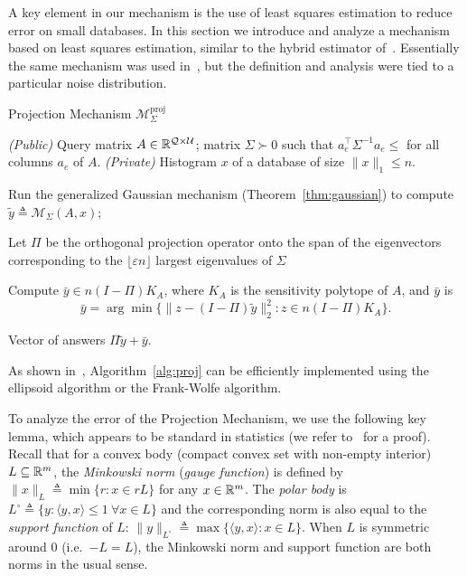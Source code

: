\documentclass{article}
\newcommand{\alg}{\mathcal{M}}
\newcommand{\mech}{\mathcal{M}}
\newcommand{\eps}{\varepsilon}
\newcommand{\univ}{U}
\newcommand{\tra}{\intercal}
\renewcommand{\univ}{\mathcal{U}}
\newcommand{\quer}{\mathcal{Q}}
\begin{document}
A key element in our mechanism is the use
of least squares estimation to reduce error on small databases. In this section we
introduce and analyze a mechanism based on least squares estimation,
similar to the hybrid estimator of~\cite{Zhang13-hybrid}. Essentially
the same mechanism was used in~\cite{NTZ}, but the definition and
analysis were tied to a particular noise distribution.

\begin{algorithm}
  \caption{Projection Mechanism    $\alg_{\Sigma}^{\text{proj}}$}\label{alg:proj}
  \begin{algorithmic}[1]
    \REQUIRE \emph{(Public)} Query matrix $A \in \R^{\quer \times
      \univ}$; matrix $\Sigma \succ 0$ such that $a_e^\tra \Sigma^{-1}
      a_e \leq$ for all columns $a_e$ of $A$.
    \REQUIRE \emph{(Private)} Histogram $x$ of a database of size
    $\|x\|_1 \leq n$.
    
    \STATE Run the generalized Gaussian mechanism
    (Theorem~\ref{thm:gaussian}) to compute $\tilde{y}
    \triangleq \mech_\Sigma(A,x)$;

    \STATE Let $\Pi$ be the orthogonal projection operator onto the
    span of the eigenvectors corresponding to the  $\lfloor \eps n
    \rfloor$ largest eigenvalues of $\Sigma$

    \STATE Compute $\bar{y} \in n(I-\Pi)K_A$, where $K_A$ is the sensitivity
    polytope of $A$, and $\bar{y}$ is
    \[
    \bar{y} = \arg\min\{\|z - (I-\Pi)\tilde{y}\|_2^2: z \in n(I-\Pi)K_A\}.
    \]

    \ENSURE  Vector of answers $\Pi \tilde{y} + \bar{y}$.
  \end{algorithmic}
\end{algorithm}

As shown in~\cite{NTZ,conjunctions}, Algorithm~\ref{alg:proj} can be
efficiently implemented using the ellipsoid algorithm or the
Frank-Wolfe algorithm.

To analyze the error of the Projection Mechanism, we use the following
key lemma, which appears to be standard in statistics (we refer
to~\cite{NTZ,conjunctions} for a proof). Recall that for a convex body
(compact convex set with non-empty interior) $L \subseteq {\mathbb{R}}^m$, the
\emph{Minkowski norm} (\emph{gauge function}) is defined by $\|x\|_L \triangleq
\min\{r: x\in rL\}$ for any $x \in {\mathbb{R}}^m$. The \emph{polar body} is $L^\circ
\triangleq \{y: \langle y, x\rangle \leq 1\ \forall x \in L\}$ and the
corresponding norm is also equal to the \emph{support function} of
$L$: $\|y\|_{L^\circ} \triangleq \max\{\langle y, x\rangle: x \in
L\}$. When $L$ is symmetric around $0$ (i.e.~$-L = L$), the Minkowski norm
and support function are both norms in the usual sense.
\end{document}
